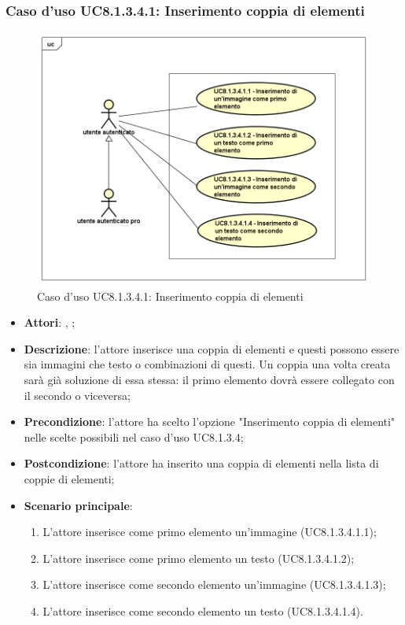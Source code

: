 	\subsubsection{Caso d'uso UC8.1.3.4.1: Inserimento coppia di elementi}
	\label{UC8.1.3.4.1}
	\begin{figure}[h]
		\centering
		\includegraphics[scale=0.5,keepaspectratio]{UML/UC8_1_3_4_1.png}
		\caption{Caso d'uso UC8.1.3.4.1: Inserimento coppia di elementi}
	\end{figure}
	\FloatBarrier
	\begin{itemize}
		\item \textbf{Attori}: \uau, \uaupro;
		\item \textbf{Descrizione}: l'attore inserisce una coppia di elementi e questi possono essere sia immagini che testo o combinazioni di questi. Un coppia una volta creata sarà già soluzione di essa stessa: il primo elemento dovrà essere collegato con il secondo o viceversa; 
		\item \textbf{Precondizione}: l'attore ha scelto l'opzione "Inserimento coppia di elementi" nelle scelte possibili nel caso d'uso UC8.1.3.4;
		\item \textbf{Postcondizione}: l'attore ha inserito una coppia di elementi nella lista di coppie di elementi; 
		\item \textbf{Scenario principale}: 
		\begin{enumerate}
			\item L'attore inserisce come primo elemento un'immagine (UC8.1.3.4.1.1);
			\item L'attore inserisce come primo elemento un testo (UC8.1.3.4.1.2);
			\item L'attore inserisce come secondo elemento un'immagine (UC8.1.3.4.1.3);
			\item L'attore inserisce come secondo elemento un testo (UC8.1.3.4.1.4).	
		\end{enumerate}
	\end{itemize}
	
